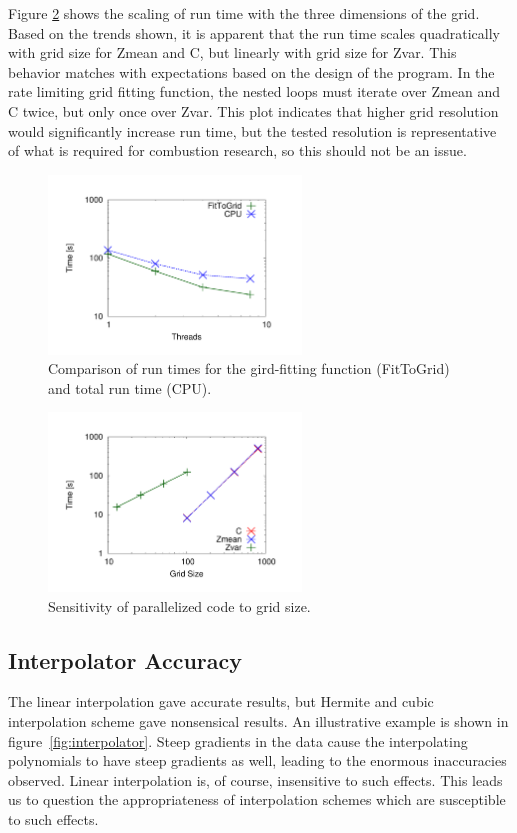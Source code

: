 \documentclass[11pt]{article}
\begin{document}
Figure \ref{fig:gridsensitivity} shows the scaling of run time with
the three dimensions of the grid. Based on the trends shown, it is
apparent that the run time scales quadratically with grid size for
Zmean and C, but linearly with grid size for Zvar. This behavior
matches with expectations based on the design of the program. In the
rate limiting grid fitting function, the nested loops must iterate
over Zmean and C twice, but only once over Zvar. This plot indicates
that higher grid resolution would significantly increase run time, but
the tested resolution is representative of what is required for
combustion research, so this should not be an issue.

\begin{figure} [h]
\centering
\includegraphics[width=0.6\textwidth]{plot_threads}
\caption{\label{fig:fittogrid} Comparison of run times for the
  gird-fitting function (FitToGrid) and total run time (CPU).}
\end{figure}

\begin{figure} [h]
\centering
\includegraphics[width=0.6\textwidth]{plot_gridsizes}
\caption{\label{fig:gridsensitivity} Sensitivity of parallelized code
  to grid size.}
\end{figure}

\subsection{Interpolator Accuracy}
The linear interpolation gave accurate results, but Hermite and cubic
interpolation scheme gave nonsensical results. An illustrative example
is shown in figure~\ref{fig:interpolator}. Steep gradients in the data
cause the interpolating polynomials to have steep gradients as well,
leading to the enormous inaccuracies observed. Linear interpolation
is, of course, insensitive to such effects. This leads us to question
the appropriateness of interpolation schemes which are susceptible to
such effects.
\end{document}
